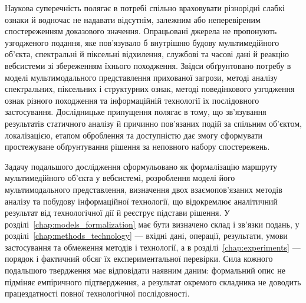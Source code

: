 Наукова суперечність полягає в потребі спільно враховувати різнорідні слабкі ознаки й водночас не надавати відсутнім, залежним або неперевіреним спостереженням доказового значення. Опрацьовані джерела не пропонують узгодженого подання, яке пов’язувало б внутрішню будову мультимедійного об’єкта, спектральні й піксельні відхилення, службові та часові дані й реакцію вебсистеми зі збереженням їхнього походження. Звідси обґрунтовано потребу в моделі мультимодального представлення прихованої загрози, методі аналізу спектральних, піксельних і структурних ознак, методі поведінкового узгодження ознак різного походження та інформаційній технології їх послідовного застосування. Дослідницьке припущення полягає в тому, що зв’язування результатів статичного аналізу й причинно пов’язаних подій за спільним об’єктом, локалізацією, етапом оброблення та доступністю дає змогу сформувати простежуване обґрунтування рішення за неповного набору спостережень.

Задачу подальшого дослідження сформульовано як формалізацію маршруту мультимедійного об’єкта у вебсистемі, розроблення моделі його мультимодального представлення, визначення двох взаємопов’язаних методів аналізу та побудову інформаційної технології, що відокремлює аналітичний результат від технологічної дії й реєструє підстави рішення. У розділі~\ref{chap:models_formalization} має бути визначено склад і зв’язки подань, у розділі~\ref{chap:methods_technology} --- вхідні дані, операції, результати, умови застосування та обмеження методів і технології, а в розділі~\ref{chap:experiments} --- порядок і фактичний обсяг їх експериментальної перевірки. Сила кожного подальшого твердження має відповідати наявним даним: формальний опис не підміняє емпіричного підтвердження, а результат окремого складника не доводить працездатності повної технологічної послідовності.
